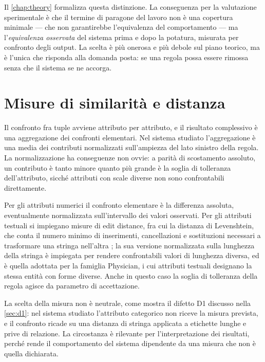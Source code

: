 Il \autoref{chap:theory} formalizza questa distinzione. La conseguenza per la valutazione
sperimentale è che il termine di paragone del lavoro non è una copertura minimale --- che non
garantirebbe l'equivalenza del comportamento --- ma l'\emph{equivalenza osservata} del sistema
prima e dopo la potatura, misurata per confronto degli output. La scelta è più onerosa e più
debole sul piano teorico, ma è l'unica che risponda alla domanda posta: se una regola possa essere
rimossa senza che il sistema se ne accorga.

\section{Misure di similarità e distanza}\label{sec:similarity}

Il confronto fra tuple avviene attributo per attributo, e il risultato complessivo è una
aggregazione dei confronti elementari. Nel sistema studiato l'aggregazione è una media dei
contributi normalizzati sull'ampiezza del lato sinistro della regola. La normalizzazione ha
conseguenze non ovvie: a parità di scostamento assoluto, un contributo è tanto minore quanto più
grande è la soglia di tolleranza dell'attributo, sicché attributi con scale diverse non sono
confrontabili direttamente.

Per gli attributi numerici il confronto elementare è la differenza assoluta, eventualmente
normalizzata sull'intervallo dei valori osservati. Per gli attributi testuali si impiegano misure
di edit distance, fra cui la distanza di Levenshtein, che conta il numero minimo di inserimenti,
cancellazioni e sostituzioni necessari a trasformare una stringa nell'altra
\cite{levenshtein1966binary}; la sua versione normalizzata sulla lunghezza della stringa è
impiegata per rendere confrontabili valori di lunghezza diversa, ed è quella adottata per la
famiglia Physician, i cui attributi testuali designano la stessa entità con forme diverse. Anche
in questo caso la soglia di tolleranza della regola agisce da parametro di accettazione.

La scelta della misura non è neutrale, come mostra il difetto D1 discusso nella
\autoref{sec:d1}: nel sistema studiato l'attributo categorico non riceve la misura prevista, e il
confronto ricade su una distanza di stringa applicata a etichette lunghe e prive di relazione. La
circostanza è rilevante per l'interpretazione dei risultati, perché rende il comportamento del
sistema dipendente da una misura che non è quella dichiarata.

